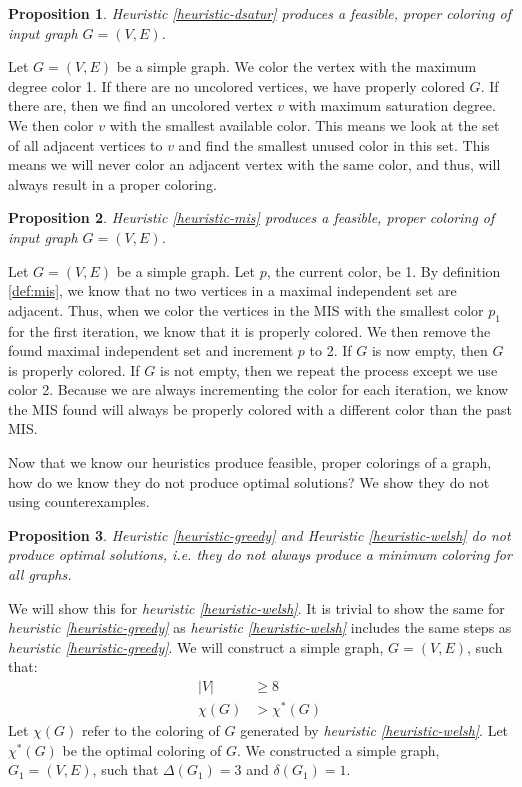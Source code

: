 \documentclass{article}
\newcounter{heuristic} \setcounter{heuristic}{0}
\newtheorem{prop}{Proposition}
\theoremstyle{definition}
\begin{document}
\begin{prop}
Heuristic \ref{heuristic-dsatur} produces a feasible, proper coloring of input graph \(G = (V, E)\).
\end{prop}

Let \(G = (V, E)\) be a simple graph. We color the vertex with the maximum degree color 1. If there are no uncolored vertices, we have properly colored $G$. If there are, then we find an uncolored vertex $v$ with maximum saturation degree. We then color $v$ with the smallest available color. This means we look at the set of all adjacent vertices to $v$ and find the smallest unused color in this set. This means we will never color an adjacent vertex with the same color, and thus, will always result in a proper coloring.

\begin{prop}
Heuristic \ref{heuristic-mis} produces a feasible, proper coloring of input graph \(G = (V, E)\).
\end{prop}

Let \(G = (V, E)\) be a simple graph. Let $p$, the current color, be 1. By definition \ref{def:mis}, we know that no two vertices in a maximal independent set are adjacent. Thus, when we color the vertices in the MIS with the smallest color \(p_1\) for the first iteration, we know that it is properly colored. We then remove the found maximal independent set and increment $p$ to 2. If $G$ is now empty, then $G$ is properly colored. If $G$ is not empty, then we repeat the process except we use color 2. Because we are always incrementing the color for each iteration, we know the MIS found will always be properly colored with a different color than the past MIS.

Now that we know our heuristics produce feasible, proper colorings of a graph, how do we know they do not produce optimal solutions? We show they do not using counterexamples.

\begin{prop}
Heuristic \ref{heuristic-greedy} and Heuristic \ref{heuristic-welsh} do not produce optimal solutions, i.e. they do not always produce a minimum coloring for all graphs.
\end{prop}

We will show this for \emph{heuristic \ref{heuristic-welsh}}. It is trivial to show the same for \emph{heuristic \ref{heuristic-greedy}} as \emph{heuristic \ref{heuristic-welsh}} includes the same steps as \emph{heuristic \ref{heuristic-greedy}}. We will construct a simple graph, \(G = (V, E)\), such that:
%
\begin{align}
|V| &\geq 8 \\
\chi(G) &> \chi^{*}(G)
\end{align}
%
Let \(\chi(G)\) refer to the coloring of \(G\) generated by \emph{heuristic \ref{heuristic-welsh}}. Let \(\chi^{*}(G)\) be the optimal coloring of \(G\). We constructed a simple graph, \(G_1 = (V, E)\), such that \(\Delta(G_1) = 3\) and \(\delta(G_1) = 1\).
\end{document}
